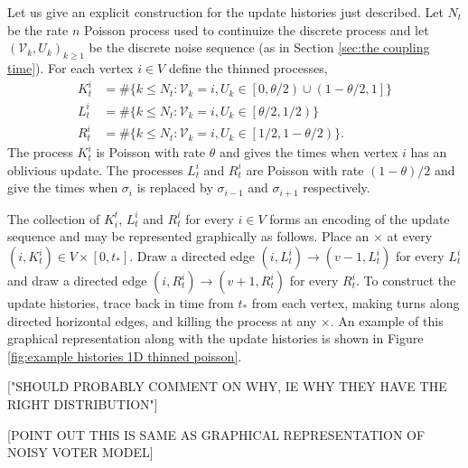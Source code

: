 	Let us give an explicit construction for the update histories just described. Let $N_t$ be the rate $n$ Poisson process used to continuize the discrete process and let $(\mathcal{V}_k, U_k)_{k\geq1}$ be the discrete noise sequence (as in Section \ref{sec:the coupling time}). For each vertex $i \in V$ define the thinned processes,
	\begin{align}
		K^i_t &= \#\{k \leq N_t: \mathcal{V}_k = i, U_k \in \left[0, \theta/2\right) \cup \left(1 - \theta/2, 1\right]\}\\
		L^i_t &= \#\{k \leq N_t: \mathcal{V}_k = i, U_k \in \left[\theta/2, 1/2\right)\}\\
		R^i_t &= \#\{k \leq N_t: \mathcal{V}_k = i, U_k \in \left[1/2, 1 - \theta/2\right)\}.
	\end{align}
	The process $K_t^i$ is Poisson with rate $\theta$ and gives the times when vertex $i$ has an oblivious update. The processes $L_t^i$ and $R_t^i$ are Poisson with rate $(1 - \theta)/2$ and give the times when $\sigma_i$ is replaced by $\sigma_{i-1}$ and $\sigma_{i+1}$ respectively.

	The collection of $K_i^t$, $L_t^i$ and $R_t^i$ for every $i \in V$ forms an encoding of the update sequence and may be represented graphically as follows. Place an $\times$ at every $(i, K_t^i) \in V \times [0, t_*]$. Draw a directed edge $(i, L_t^i) \rightarrow (v - 1, L_t^i)$ for every $L_t^i$ and draw a directed edge $(i, R_t^i) \rightarrow (v + 1, R_t^i)$ for every $R_t^i$. To construct the update histories, trace back in time from $t_*$ from each vertex, making turns along directed horizontal edges, and killing the process at any $\times$. An example of this graphical representation along with the update histories is shown in Figure \ref{fig:example histories 1D thinned poisson}.

	["SHOULD PROBABLY COMMENT ON WHY, IE WHY THEY HAVE THE RIGHT DISTRIBUTION"]

	[POINT OUT THIS IS SAME AS GRAPHICAL REPRESENTATION OF NOISY VOTER MODEL]


